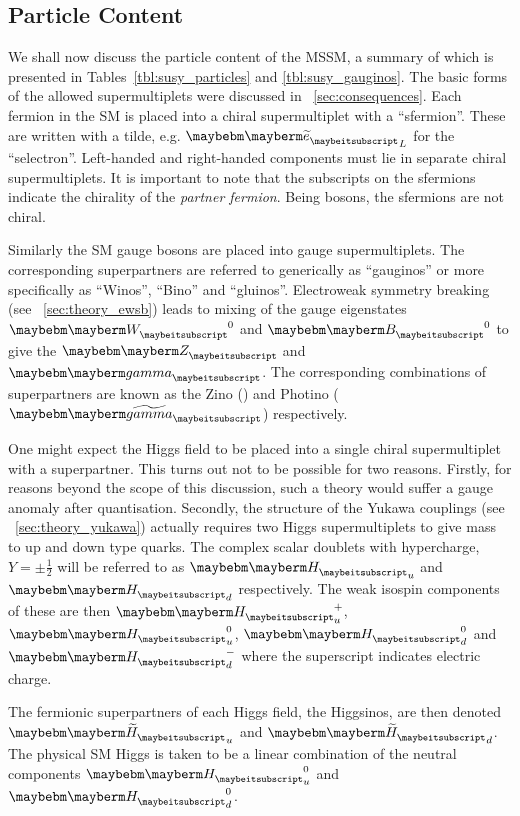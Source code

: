 \subsection{Particle Content}
We shall now discuss the particle content of the \ac{MSSM}, a summary of which
is presented in Tables~\ref{tbl:susy_particles} and \ref{tbl:susy_gauginos}. The
basic forms of the allowed supermultiplets were discussed in
\sec~\ref{sec:consequences}. Each fermion in the \ac{SM} is placed into a chiral
supermultiplet with a \spinzero ``sfermion''. These are written with a tilde,
e.g. $\PSe_L$ for the ``selectron''. Left-handed and right-handed components
must lie in separate chiral supermultiplets. It is important to note that the
subscripts on the sfermions indicate the chirality of the \emph{partner
  fermion}. Being \spinzero bosons, the sfermions are not chiral.

Similarly the \ac{SM} gauge bosons are placed into gauge supermultiplets. The
corresponding superpartners are referred to generically as ``gauginos'' or more
specifically as ``Winos'', ``Bino'' and ``gluinos''. Electroweak symmetry
breaking (see \sec~\ref{sec:theory_ewsb}) leads to mixing of the gauge
eigenstates $\PW^0$ and $\PB^0$ to give the $\PZ$ and $\Pphoton$. The corresponding
combinations of superpartners are known as the Zino (\PSZ) and Photino
($\PSphotino$) respectively.

One might expect the Higgs field to be placed into a single chiral
supermultiplet with a \spinhalf superpartner. This turns out not to be possible
for two reasons. Firstly, for reasons beyond the scope of this discussion, such
a theory would suffer a gauge anomaly after quantisation. Secondly, the
structure of the Yukawa couplings (see \sec~\ref{sec:theory_yukawa}) actually
requires two Higgs supermultiplets to give mass to up and down type quarks. The
complex scalar doublets with hypercharge, $Y=\pm\frac{1}{2}$ will be referred to
as $\PHiggs_u$ and $\PHiggs_d$ respectively. The weak isospin components of
these are then $\PHiggs_u^+$, $\PHiggs_u^0$, $\PHiggs_d^0$ and $\PHiggs_d^-$
where the superscript indicates electric charge.

The fermionic superpartners of each Higgs field, the Higgsinos, are then denoted
$\PSHiggs_u$ and $\PSHiggs_d$. The physical \ac{SM} Higgs is taken to be a
linear combination of the neutral components $\PHiggs_u^0$ and $\PHiggs_d^0$.





